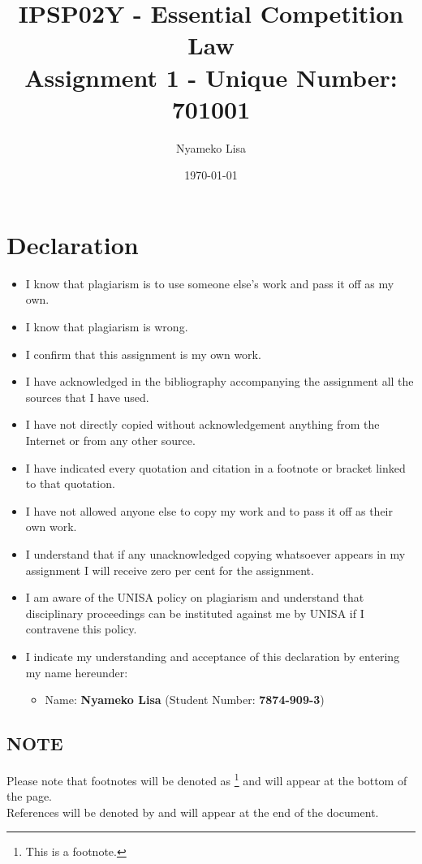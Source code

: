 \documentclass[11pt]{article}
\author{Nyameko Lisa}
\date{\today}
\title{IPSP02Y - Essential Competition Law\\\medskip
\large Assignment 1 - Unique Number: 701001}
\begin{document}
\maketitle
\section*{Declaration}
\label{sec:orge8a8d2f}
\begin{itemize}
\item I know that plagiarism is to use someone else’s work and pass it off as my own.
\item I know that plagiarism is wrong.
\item I confirm that this assignment is my own work.
\item I have acknowledged in the bibliography accompanying the assignment all the sources that I have used.
\item I have not directly copied without acknowledgement anything from the Internet or from any other source.
\item I have indicated every quotation and citation in a footnote or bracket linked to that quotation.
\item I have not allowed anyone else to copy my work and to pass it off as their own work.
\item I understand that if any unacknowledged copying whatsoever appears in my assignment I will receive zero per cent for the assignment.
\item I am aware of the UNISA policy on plagiarism and understand that disciplinary proceedings can be instituted against me by UNISA if I contravene this policy.
\item I indicate my understanding and acceptance of this declaration by
entering my name hereunder:
\begin{itemize}
\item Name: \textbf{Nyameko Lisa} (Student Number: \textbf{7874-909-3})
\end{itemize}
\end{itemize}

\subsection*{NOTE}
\label{sec:orgead09eb}
Please note that footnotes will be denoted as \footnote{This is a footnote.} and will
appear at the bottom of the page.\\
References will be denoted by \cite{wipo83_paris_conve_protect_ip} and will appear at the end of the document.
\newpage
\end{document}

